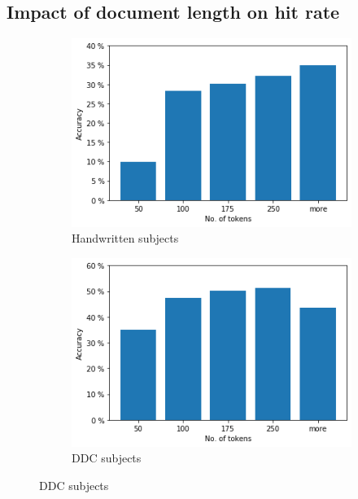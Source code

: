 \subsection{Impact of document length on hit rate} \label{results_length}

\begin{figure}
  \begin{subfigure}[t]{.32\textwidth}
    \centering
    \includegraphics[width=\textwidth]{figures/supervised_approach/sm_hw_length.png}
    \caption{Handwritten subjects}
    \label{fig:sm_hw_length}
  \end{subfigure}
  \begin{subfigure}[t]{.32\textwidth}
    \centering
    \includegraphics[width=\textwidth]{figures/supervised_approach/sm_ddc_length.png}
    \caption{DDC subjects}
    \label{fig:sm_ddc_length}
  \end{subfigure}

\end{figure}
